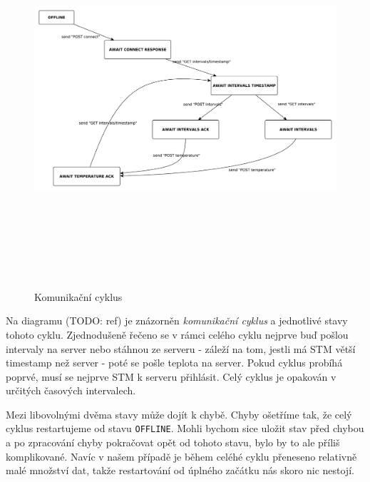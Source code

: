 \begin{figure}[tbh]\centering
\includegraphics[width=140mm, height=140mm]{../diagrams/stm_komunikacni_cyklus.pdf}
\caption{Komunikační cyklus}
\label{stm-komunikacni-cyklus}
\end{figure}

Na diagramu (TODO: ref) je znázorněn \emph{komunikační cyklus} a jednotlivé stavy tohoto cyklu.
Zjednodušeně řečeno se v rámci celého cyklu nejprve buď pošlou intervaly na server nebo stáhnou ze
serveru - záleží na tom, jestli má STM větší timestamp než server - poté se pošle teplota na server.
Pokud cyklus probíhá poprvé, musí se nejprve STM k serveru přihlásit.
Celý cyklus je opakován v určitých časových intervalech.

Mezi libovolnými dvěma stavy může dojít k chybě.
Chyby ošetříme tak, že celý cyklus restartujeme od stavu \texttt{OFFLINE}.
Mohli bychom sice uložit stav před chybou a po zpracování chyby pokračovat opět od tohoto stavu,
bylo by to ale příliš komplikované.
Navíc v našem případě je během celéhé cyklu přeneseno relativně malé množství dat, takže restartování
od úplného začátku nás skoro nic nestojí.





